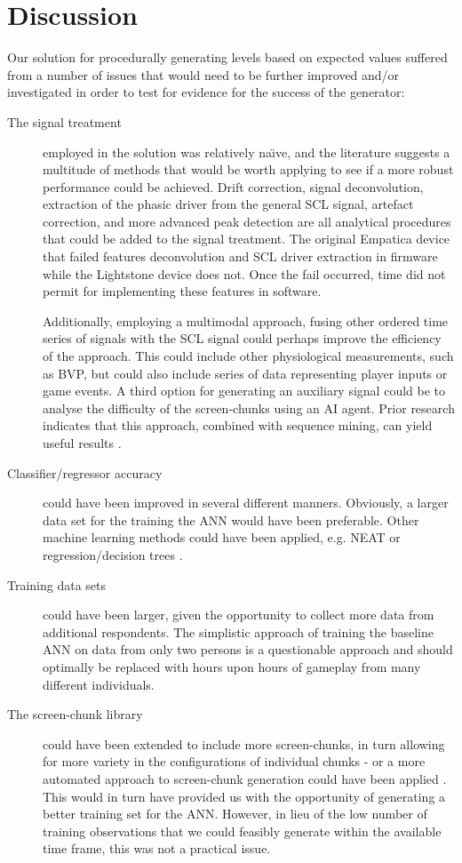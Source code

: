 \documentclass{llncs}
\begin{document}
\section{Discussion}
Our solution for procedurally generating levels based on expected values suffered from a number of issues that would need to be further improved and/or investigated in order to test for evidence for the success of the generator:
\begin{description}
\item [The signal treatment] employed in the solution was relatively na\"{\i}ve, and the literature suggests a multitude of methods that would be worth applying to see if a more robust performance could be achieved.
Drift correction, signal deconvolution, extraction of the phasic driver from the general SCL signal, artefact correction, and more advanced peak detection are all analytical procedures that could be added to the signal treatment. The original Empatica device that failed features deconvolution and SCL driver extraction in firmware while the Lightstone device does not. Once the fail occurred, time did not permit for implementing these features in software.

Additionally, employing a multimodal approach, fusing other ordered time series of signals with the SCL signal could perhaps improve the efficiency of the approach\cite{martinez2011mining}. This could include other physiological measurements, such as BVP, but could also include series of data representing player inputs or game events.
A third option for generating an auxiliary signal could be to analyse the difficulty of the screen-chunks using an AI agent.
Prior research indicates that this approach, combined with sequence mining, can yield useful results \cite{martinez2011mining}.%
\item [Classifier/regressor accuracy] could have been improved in several different manners. Obviously, a larger data set for the training the ANN would have been preferable. Other machine learning methods could have been applied, e.g. NEAT or regression/decision trees \cite{liu2009dynamic}.
\item [Training data sets] could have been larger, given the opportunity to collect more data from additional respondents.
The simplistic approach of training the baseline ANN on data from only two persons is a questionable approach and should optimally be replaced with hours upon hours of gameplay from many different individuals.
\item [The screen-chunk library] could have been extended to include more screen-chunks, in turn allowing for more variety in the configurations of individual chunks - or a more automated approach to screen-chunk generation could have been applied \cite{shaker2011feature}.
This would in turn have provided us with the opportunity of generating a better training set for the ANN. However, in lieu of the low number of training observations that we could feasibly generate within the available time frame, this was not a practical issue.
\end{description}
\end{document}

